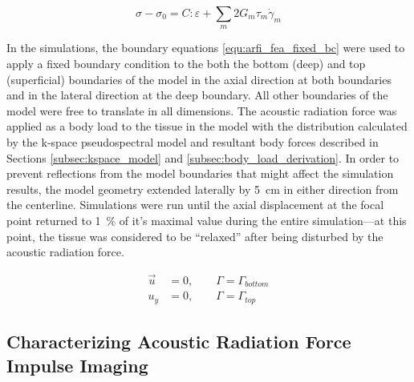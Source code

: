 			\begin{equation}
				\label{fea:time_deformation_visco}
				\sigma - \sigma_0 = C : \varepsilon + \sum_m 2 G_m \tau_m \dot{\gamma}_m 
			\end{equation}

			In the simulations, the boundary equations \ref{equ:arfi_fea_fixed_bc} were used to apply a fixed boundary condition to the both the bottom (deep) and top (superficial) boundaries of the model in the axial direction at both boundaries and in the lateral direction at the deep boundary. All other boundaries of the model were free to translate in all dimensions. The acoustic radiation force was applied as a body load to the tissue in the model with the distribution calculated by the k-space pseudospectral model and resultant body forces described in Sections \ref{subsec:kspace_model} and \ref{subsec:body_load_derivation}. In order to prevent reflections from the model boundaries that might affect the simulation results, the model geometry extended laterally by \SI{5}{\cm} in either direction from the centerline. Simulations were run until the axial displacement at the focal point returned to \SI{1}{\percent} of it's maximal value during the entire simulation---at this point, the tissue was considered to be ``relaxed'' after being disturbed by the acoustic radiation force.

			\begin{subequations}
				\label{equ:arfi_fea_fixed_bc}
				\begin{align}
					\vec{u} &= 0, \qquad \Gamma = \Gamma_{bottom} \\
					u_y &= 0, \qquad \Gamma = \Gamma_{top}
				\end{align}
			\end{subequations}

		\subsection{Characterizing Acoustic Radiation Force Impulse Imaging}

